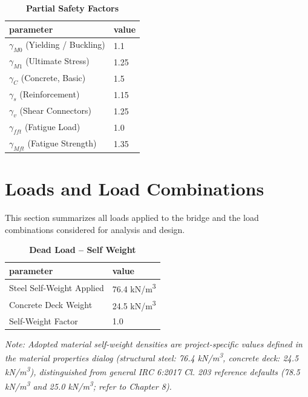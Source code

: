 \documentclass[12pt,a4paper]{report}
\numberwithin{table}{chapter}
\numberwithin{figure}{chapter}
\begin{document}
\vspace{0.4em}
\begin{longtable}{|L{5.5cm}|p{10.0cm}|}
\caption{\textbf{Partial Safety Factors}}\\
\hline
\textbf{parameter} & \textbf{value} \\
\hline
\textnormal{$\gamma_{M0}$ (Yielding / Buckling)} & 1.1 \\[6pt]
\hline
\textnormal{$\gamma_{M1}$ (Ultimate Stress)} & 1.25 \\[6pt]
\hline
\textnormal{$\gamma_C$ (Concrete, Basic)} & 1.5 \\[6pt]
\hline
\textnormal{$\gamma_s$ (Reinforcement)} & 1.15 \\[6pt]
\hline
\textnormal{$\gamma_v$ (Shear Connectors)} & 1.25 \\[6pt]
\hline
\textnormal{$\gamma_{fft}$ (Fatigue Load)} & 1.0 \\[6pt]
\hline
\textnormal{$\gamma_{Mft}$ (Fatigue Strength)} & 1.35 \\[6pt]
\hline
\end{longtable}


\chapter{Loads and Load Combinations}

This section summarizes all loads applied to the bridge and the load combinations considered for analysis and design.

\vspace{1em}
\begin{longtable}{|L{5.5cm}|p{10.0cm}|}
\caption{\textbf{Dead Load -- Self Weight}}\\
\hline
\textbf{parameter} & \textbf{value} \\
\hline
\textnormal{Steel Self-Weight Applied} & 76.4 kN/m\textsuperscript{3} \\[6pt]
\hline
\textnormal{Concrete Deck Weight} & 24.5 kN/m\textsuperscript{3} \\[6pt]
\hline
\textnormal{Self-Weight Factor} & 1.0 \\[6pt]
\hline
\end{longtable}
\noindent\textit{Note: Adopted material self-weight densities are project-specific values defined in the material properties dialog (structural steel: 76.4 kN/m\textsuperscript{3}, concrete deck: 24.5 kN/m\textsuperscript{3}), distinguished from general IRC 6:2017 Cl. 203 reference defaults (78.5 kN/m\textsuperscript{3} and 25.0 kN/m\textsuperscript{3}; refer to Chapter 8).}
\end{document}
